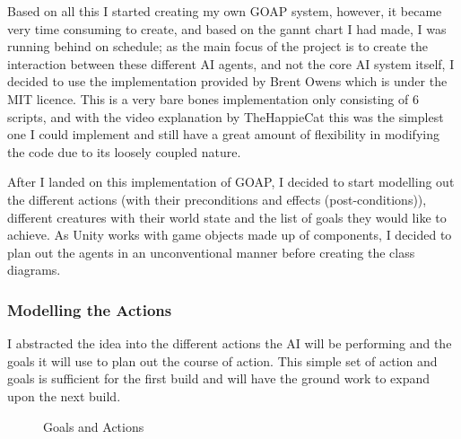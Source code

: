 \documentclass[10pt]{report}
\begin{document}
Based on all this I started creating my own GOAP system, however, it became very time consuming to create, and based on the gannt chart I had made, I was running behind on schedule; as the main focus of the project is to create the interaction between these different AI agents, and not the core AI system itself, I decided to use the implementation provided by Brent Owens \cite{brentOwensGoapCode} which is under the MIT licence. This is a very bare bones implementation only consisting of 6 scripts, and with the video explanation by TheHappieCat this was the simplest one I could implement and still have a great amount of flexibility in modifying the code due to its loosely coupled nature.

After I landed on this implementation of GOAP, I decided to start modelling out the different actions (with their preconditions and effects (post-conditions)), different creatures with their world state and the list of goals they would like to achieve. As Unity works with game objects made up of components, I decided to plan out the agents in an unconventional manner before creating the class diagrams. 
\subsubsection{Modelling the Actions}
I abstracted the idea into the different actions the AI will be performing and the goals it will use to plan out the course of action. This simple set of action and goals is sufficient for the first build and will have the ground work to expand upon the next build.

\begin{figure}[H]
    \centering
    \caption{Goals and Actions}
\end{figure}
\end{document}
